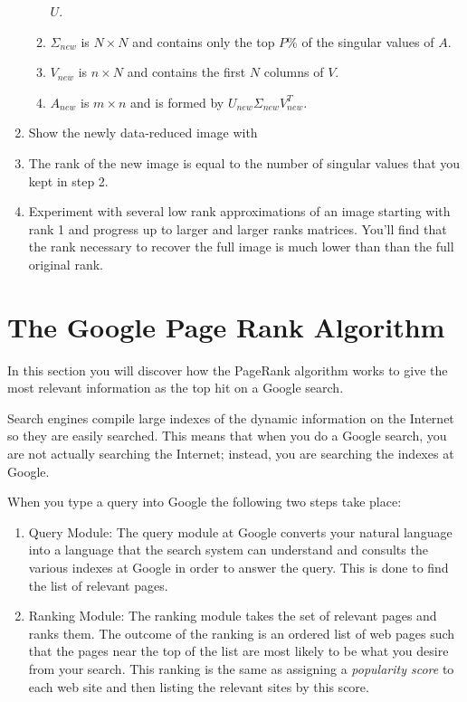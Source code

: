 \begin{problem}
\begin{enumerate}
\begin{enumerate}
                    $U$.
                \item $\Sigma_{new}$ is $N \times N$ and contains only the top $P$\% of
                    the singular values of $A$.
                \item $V_{new}$ is $n \times N$ and contains the first $N$ columns of $V$.
                \item $A_{new}$ is $m \times n$ and is formed by $U_{new} \Sigma_{new}
                    V_{new}^T$.  
            \end{enumerate}
        \item Show the newly data-reduced image with \\
        \item The rank of the new image is equal to the number of singular values that you
            kept in step 2.  
        \item Experiment with several low rank approximations of an image starting with
            rank 1 and progress up to larger and larger ranks matrices.  You'll find that
            the rank necessary to recover the full image is much lower than than the full
            original rank.
    \end{enumerate}
\end{problem}


\newpage\section{The Google Page Rank Algorithm}
In this section you will discover how the PageRank algorithm works to give the most relevant
information as the top hit on a Google search.  

Search engines compile large indexes of the dynamic information on the Internet so they
are easily searched.  This means that when you do a Google search, you are not actually
searching the Internet; instead, you are searching the indexes at Google.

When you type a query into Google the following two steps take place:
\begin{enumerate}
    \item Query Module: The query module at Google converts your natural language into a
        language that the search system can understand and consults the various indexes
        at Google in order to answer the query.  This is done to find the list of relevant
        pages.
    \item Ranking Module: The ranking module takes the set of relevant pages and ranks
        them. The outcome of the ranking is an ordered list of web pages such
        that the pages near the top of the list are most likely to be what you desire from
        your search. This ranking is the same as assigning a {\it popularity score} to
        each web site and then listing the relevant sites by this score.  
\end{enumerate}


